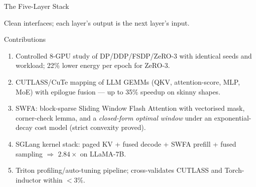 \documentclass[10pt,aspectratio=169]{beamer}
\begin{document}
\begin{frame}{The Five-Layer Stack}
  \centering
  \vspace{1ex}

  Clean interfaces; each layer's output is the next layer's input.
\end{frame}

\begin{frame}{Contributions}
  \begin{enumerate}
    \item Controlled 8-GPU study of DP/DDP/FSDP/ZeRO-3 with identical
          seeds and workload; 22\% lower energy per epoch for ZeRO-3.
    \item CUTLASS/CuTe mapping of LLM GEMMs (QKV, attention-score,
          MLP, MoE) with epilogue fusion — up to 35\% speedup on skinny
          shapes.
    \item \alert{SWFA}: block-sparse Sliding Window Flash Attention
          with vectorised mask, corner-check lemma, and a
          \emph{closed-form optimal window} under an exponential-decay
          cost model (strict convexity proved).
    \item SGLang kernel stack: paged KV + fused decode + SWFA prefill
          + fused sampling $\Rightarrow$ $2.84\times$ on LLaMA-7B.
    \item Triton profiling/auto-tuning pipeline; cross-validates
          CUTLASS and Torch-inductor within $<\!3\%$.
  \end{enumerate}
\end{frame}
\end{document}
